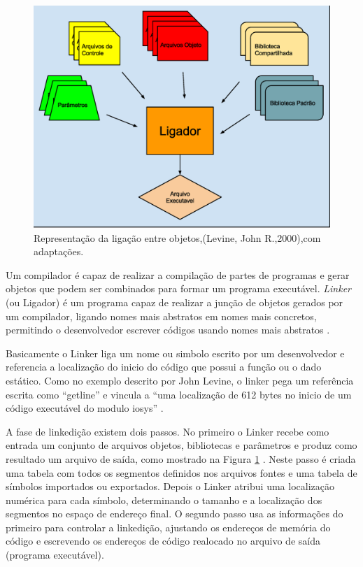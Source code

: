 \begin{figure}[h]
    \centering
        \includegraphics[keepaspectratio=true,scale=0.6]{figuras/ligador.eps}
    \caption{Representação da ligação entre objetos,(Levine,
											    John R.,2000),com adaptações.}
    \label{fig03}
\end{figure}

Um compilador é capaz de realizar a compilação de partes de programas e gerar
 objetos que podem ser combinados para formar um programa executável. 
\textit{Linker} (ou Ligador) é um programa capaz de realizar a junção 
de objetos gerados por um compilador, ligando nomes mais abstratos em nomes
 mais concretos, permitindo o desenvolvedor escrever códigos usando nomes 
mais abstratos \cite{ref36}.


 Basicamente o Linker liga um nome ou simbolo escrito por um desenvolvedor e
 referencia a localização do inicio do código que possui a função ou o dado
 estático. Como no exemplo descrito por John Levine, o linker pega um 
referência escrita como “getline”  e vincula a “uma localização de 612 bytes 
no inicio de um código executável do modulo iosys” \cite{ref36}. 

A fase de linkedição existem dois passos. No primeiro o Linker recebe como 
entrada um conjunto de arquivos objetos, bibliotecas e parâmetros e produz
 como resultado um arquivo de saída, como mostrado na Figura \ref{fig03}
 \cite{ref37}. Neste passo é criada uma tabela com 
todos os segmentos definidos nos arquivos fontes e uma tabela de símbolos 
importados ou exportados. Depois o Linker atribui uma localização numérica 
para cada símbolo, determinando o tamanho e a localização dos segmentos no
 espaço de endereço final. O segundo passo usa as informações do primeiro
 para controlar a linkedição, ajustando os endereços de memória do código e
 escrevendo os endereços de código realocado no arquivo de saída
 (programa executável).


